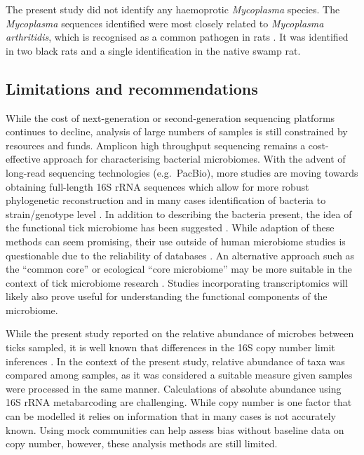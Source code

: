 \documentclass[a4paper, nobind]{templates/ociamthesis}
\begin{document}
The present study did not identify any haemoprotic \emph{Mycoplasma} species. The \emph{Mycoplasma} sequences identified were most closely related to \emph{Mycoplasma arthritidis}, which is recognised as a common pathogen in rats \autocite{dybvigGenomeMycoplasmaArthritidis2008}.
It was identified in two black rats and a single identification in the native swamp rat.

\hypertarget{limitations-and-recommendations}{%
\subsection{Limitations and recommendations}\label{limitations-and-recommendations}}

While the cost of next-generation or second-generation sequencing platforms continues to decline, analysis of large numbers of samples is still constrained by resources and funds.
Amplicon high throughput sequencing remains a cost-effective approach for characterising bacterial microbiomes.
With the advent of long-read sequencing technologies (e.g.~PacBio), more studies are moving towards obtaining full-length 16S rRNA sequences which allow for more robust phylogenetic reconstruction and in many cases identification of bacteria to strain/genotype level \autocite{earlSpecieslevelBacterialCommunity2018,callahanHighthroughputAmpliconSequencing2019}.
In addition to describing the bacteria present, the idea of the functional tick microbiome has been suggested \autocite{estrada-penaTaxonomicVariabilityFunctional2020}.
While adaption of these methods can seem promising, their use outside of human microbiome studies is questionable due to the reliability of databases \autocite{bonnetUpdateIntricateTango2020,sunInferencebasedAccuracyMetagenome2020}.
An alternative approach such as the ``common core'' or ecological ``core microbiome'' may be more suitable in the context of tick microbiome research \autocite{riselyApplyingCoreMicrobiome2020}.
Studies incorporating transcriptomics will likely also prove useful for understanding the functional components of the microbiome.

While the present study reported on the relative abundance of microbes between ticks sampled, it is well known that differences in the 16S copy number limit inferences \autocite{brooksTruthMetagenomicsQuantifying2015,loucaCorrecting16SRRNA2018}.
In the context of the present study, relative abundance of taxa was compared among samples, as it was considered a suitable measure given samples were processed in the same manner.
Calculations of absolute abundance using 16S rRNA metabarcoding are challenging. While copy number is one factor that can be modelled it relies on information that in many cases is not accurately known.
Using mock communities can help assess bias without baseline data on copy number, however, these analysis methods are still limited.
\end{document}
